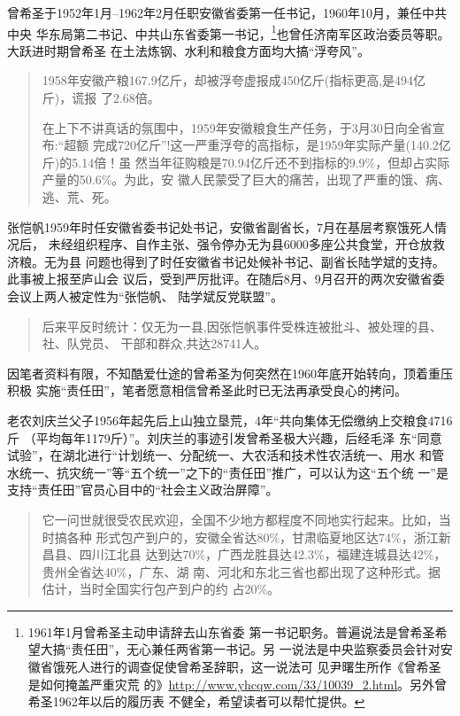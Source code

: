 曾希圣于1952年1月--1962年2月任职安徽省委第一任书记，1960年10月，兼任中共中央
华东局第二书记、中共山东省委第一书记，\footnote{1961年1月曾希圣主动申请辞去山东省委
  第一书记职务。普遍说法是曾希圣希望大搞“责任田”，无心兼任两省第一书记。另
  一说法是中央监察委员会针对安徽省饿死人进行的调查促使曾希圣辞职，这一说法可
  见尹曙生所作《曾希圣是如何掩盖严重灾荒
  的》\url{http://www.yhcqw.com/33/10039_2.html}。另外曾希圣1962年以后的履历表
  不健全，希望读者可以帮忙提供。}也曾任济南军区政治委员等职。大跃进时期曾希圣
在土法炼钢、水利和粮食方面均大搞“浮夸风”。
\begin{quotation}
  1958年安徽产粮167.9亿斤，却被浮夸虚报成450亿斤(指标更高,是494亿斤)，谎报
  了2.68倍。\cite{zhangfandang}

  在上下不讲真话的氛围中，1959年安徽粮食生产任务，于3月30日向全省宣布:“超额
  完成720亿斤”!这一严重浮夸的高指标，是1959年实际产量(140.2亿斤)的5.14倍！虽
  然当年征购粮是70.94亿斤还不到指标的9.9\%，但却占实际产量的50.6\%。为此，安
  徽人民蒙受了巨大的痛苦，出现了严重的饿、病、逃、荒、死。\cite{zhang1959}
\end{quotation}

张恺帆1959年时任安徽省委书记处书记，安徽省副省长，7月在基层考察饿死人情况后，
未经组织程序、自作主张、强令停办无为县6000多座公共食堂，开仓放救济粮。无为县
问题也得到了时任安徽省书记处候补书记、副省长陆学斌的支持。此事被上报至庐山会
议后，受到严厉批评。在随后8月、9月召开的两次安徽省委会议上两人被定性为“张恺帆、
陆学斌反党联盟”。
\begin{quotation}
  后来平反时统计：仅无为一县,因张恺帆事件受株连被批斗、被处理的县、社、队党员、
  干部和群众,共达28741人。\cite{zhang1959}
\end{quotation}

因笔者资料有限，不知酷爱仕途的曾希圣为何突然在1960年底开始转向，顶着重压积极
实施“责任田”，笔者愿意相信曾希圣此时已无法再承受良心的拷问。

老农刘庆兰父子1956年起先后上山独立垦荒，4年“共向集体无偿缴纳上交粮食4716斤
（平均每年1179斤）”。\cite{anhuiliushi}刘庆兰的事迹引发曾希圣极大兴趣，后经毛泽
东“同意试验”，在湖北进行“计划统一、分配统一、大农活和技术性农活统一、用水
和管水统一、抗灾统一”等“五个统一”之下的“责任田”推广，可以认为这“五个统
一”是支持“责任田”官员心目中的“社会主义政治屏障”。

\begin{quotation}
  它一问世就很受农民欢迎，全国不少地方都程度不同地实行起来。比如，当时搞各种
  形式包产到户的，安徽全省达80\%，甘肃临夏地区达74\%，浙江新昌县、四川江北县
  达到达70\%，广西龙胜县达42.3\%，福建连城县达42\%，贵州全省达40\%，广东、湖
  南、河北和东北三省也都出现了这种形式。据估计，当时全国实行包产到户的约
  占20\%。\cite[1078]{boyibo}
\end{quotation}

